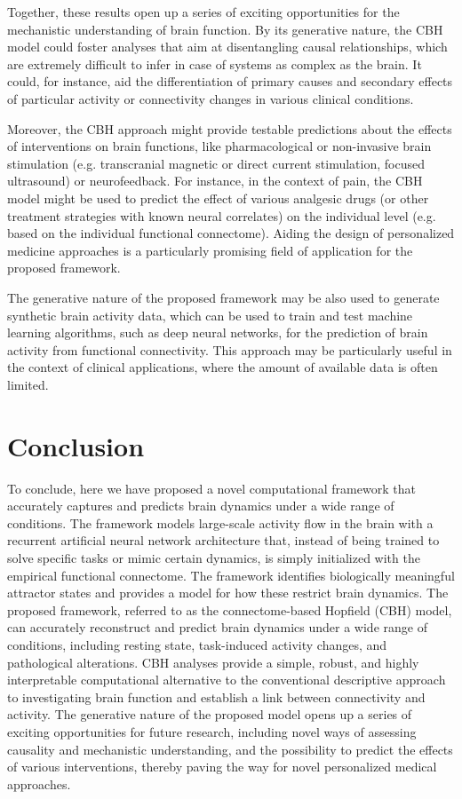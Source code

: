 \documentclass{article}
\begin{document}
Together, these results open up a series of exciting opportunities for the mechanistic understanding of brain function.
By its generative nature, the CBH model could foster analyses that aim at disentangling causal relationships, which are
extremely difficult to infer in case of systems as complex as the brain. It could, for instance, aid the differentiation
of primary causes and secondary effects of particular activity or connectivity changes in various clinical conditions.

Moreover, the CBH approach might provide testable predictions about the effects of interventions on brain functions,
like pharmacological or non-invasive brain stimulation (e.g. transcranial magnetic or direct current stimulation,
focused ultrasound) or neurofeedback.
For instance, in the context of pain, the CBH model might be used to predict the effect of various analgesic drugs (or
other treatment strategies with known neural correlates) on the individual level (e.g. based on the individual
functional connectome). Aiding the design of personalized medicine approaches is a particularly promising field of
application for the proposed framework.

The generative nature of the proposed framework may be also used to generate synthetic brain activity data, which can
be used to train and test machine learning algorithms, such as deep neural networks, for the prediction of brain
activity from functional connectivity. This approach may be particularly useful in the context of clinical applications,
where the amount of available data is often limited.

\section{Conclusion}\label{Conclusion}

To conclude, here we have proposed a novel computational framework that accurately captures and predicts brain dynamics
under a wide range of conditions. The framework models large-scale activity flow in the brain with a recurrent
artificial neural network architecture that, instead of being trained to solve specific tasks or mimic certain dynamics,
is simply initialized with the empirical functional connectome. The framework identifies biologically meaningful
attractor states and provides a model for how these restrict brain dynamics. The proposed framework, referred to as the
connectome-based Hopfield (CBH) model, can accurately reconstruct and predict brain dynamics under a wide range of
conditions, including resting state, task-induced activity changes, and pathological alterations. CBH analyses provide
a simple, robust, and highly interpretable computational alternative to the conventional descriptive approach to
investigating brain function and establish a link between connectivity and activity. The generative nature of the
proposed model opens up a series of exciting opportunities for future research, including novel ways of assessing
causality and mechanistic understanding, and the possibility to predict the effects of various interventions, thereby
paving the way for novel personalized medical approaches.
\end{document}

